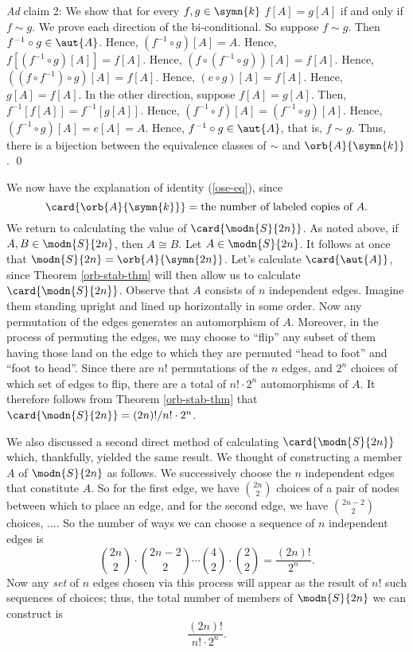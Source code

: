 \emph{Ad} claim 2: We show that for every $f,g\in\symn{k}$ $f[A]=g[A]$ if and only if $f\sim g$. We prove each direction of the bi-conditional. So suppose $f\sim g$. Then 
$f^{-1}\circ g \in \aut{A}$. Hence, $(f^{-1}\circ g)[A] = A$. Hence, $f[(f^{-1}\circ g)[A]] = f[A]$. Hence, $(f\circ(f^{-1}\circ g))[A] = f[A]$. Hence, $((f\circ f^{-1})\circ g)[A] = f[A]$. Hence, $(e\circ g)[A] = f[A]$. Hence, $g[A]=f[A]$. In the other direction, suppose $f[A]=g[A]$. Then, $f^{-1}[f[A]]=f^{-1}[g[A]]$. Hence, $(f^{-1}\circ f)[A]=(f^{-1}\circ g)[A]$. Hence, $(f^{-1}\circ g)[A]=e[A]= A$. Hence, $f^{-1}\circ g\in \aut{A}$, that is, $f\sim g$. Thus, there is a bijection between the equivalence classes of $\sim$ and $\orb{A}{\symn{k}}$. \qed

We now have the explanation of identity (\ref{ose-eq}), since 
\[
\card{\orb{A}{\symn{k}}}=\mbox{the number of labeled copies of }A.
\]
\iffalse
We return to calculating the value of $\card{\modn{S}{2n}}$. As noted above, if $A,B\in\modn{S}{2n}$, then $A\cong B$. Let $A\in\modn{S}{2n}$. It follows at once that $\modn{S}{2n}=\orb{A}{\symn{2n}}$. Let's calculate $\card{\aut{A}}$, since Theorem \ref{orb-stab-thm} will then allow us to calculate $\card{\modn{S}{2n}}$. Observe that $A$ consists of $n$ independent edges. Imagine them standing upright and lined up horizontally in some order. Now any permutation of the edges generates an automorphism of $A$. Moreover, in the process of permuting the edges, we may choose to ``flip'' any subset of them having those land on the edge to which they are permuted ``head to foot'' and ``foot to head''. Since there are $n!$ permutations of the $n$ edges, and $2^n$ choices of which set of edges to flip, there are a total of $n!\cdot 2^n$ automorphisms of $A$. It therefore follows from Theorem \ref{orb-stab-thm} that $ \card{\modn{S}{2n}}= (2n)!/n!\cdot 2^n$.

We also discussed a second direct method of calculating $\card{\modn{S}{2n}}$ which, thankfully, yielded the same result. We thought of constructing a member $A$ of $\modn{S}{2n}$ as follows. We successively choose the $n$ independent edges that constitute $A$. So for the first edge, we have $\binom{2n}{2}$ choices of a pair of nodes between which to place an edge, and for the second edge, we have $\binom{2n-2}{2}$ choices, .... So the number of ways we can choose a sequence of $n$ independent edges is
\[
\binom{2n}{2}\cdot\binom{2n-2}{2}\cdots\binom{4}{2}\cdot\binom{2}{2}= \frac{(2n)!}{2^n}.
\]
Now any \emph{set} of $n$ edges chosen via this process will appear as the result of $n!$ such sequences of choices; thus, the total number of members of $\modn{S}{2n}$ we can construct is 
\[
\frac{(2n)!}{n!\cdot 2^n}.
\]
\iffalse
\bigskip
\noindent\makebox[\linewidth]{\rule{\paperwidth}{0.4pt}}

